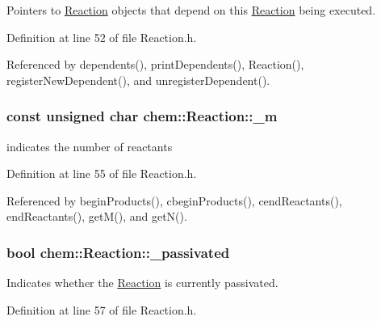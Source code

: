 Pointers to \hyperlink{classchem_1_1Reaction}{Reaction} objects that depend on this \hyperlink{classchem_1_1Reaction}{Reaction} being executed. 



Definition at line 52 of file Reaction.\-h.



Referenced by dependents(), print\-Dependents(), Reaction(), register\-New\-Dependent(), and unregister\-Dependent().

\hypertarget{classchem_1_1Reaction_a07b3c7e8a82111c786144158bc3cb4e5}{
\subsubsection[{\-\_\-m}]{\setlength{\rightskip}{0pt plus 5cm}const unsigned char {\bf chem\-::\-Reaction\-::\-\_\-m}}}\label{classchem_1_1Reaction_a07b3c7e8a82111c786144158bc3cb4e5}


indicates the number of reactants 



Definition at line 55 of file Reaction.\-h.



Referenced by begin\-Products(), cbegin\-Products(), cend\-Reactants(), end\-Reactants(), get\-M(), and get\-N().

\hypertarget{classchem_1_1Reaction_aa0151836a315ac001ef94277b126c329}{
\subsubsection[{\-\_\-passivated}]{\setlength{\rightskip}{0pt plus 5cm}bool {\bf chem\-::\-Reaction\-::\-\_\-passivated}}}\label{classchem_1_1Reaction_aa0151836a315ac001ef94277b126c329}


Indicates whether the \hyperlink{classchem_1_1Reaction}{Reaction} is currently passivated. 



Definition at line 57 of file Reaction.\-h.



